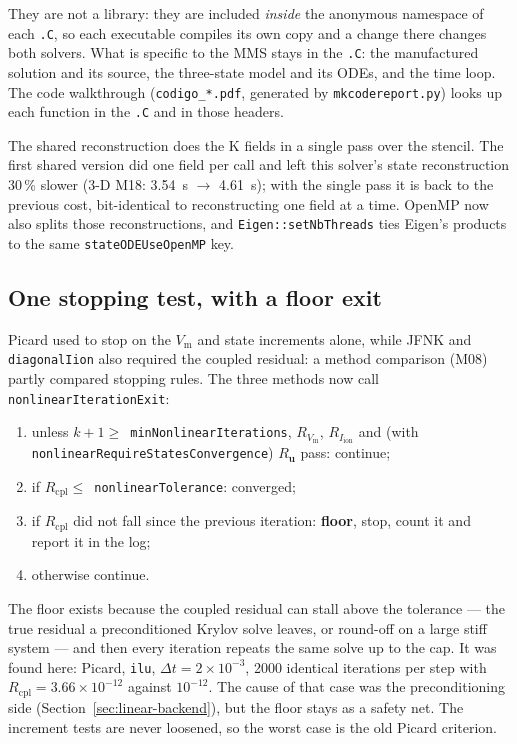 \documentclass[11pt,a4paper]{article}
\newcommand{\code}[1]{\texttt{\small #1}}
\newcommand{\Vm}{V_{\text{m}}}
\newcommand{\Iion}{I_{\mathrm{ion}}}
\begin{document}
They are not a library: they are included \emph{inside} the anonymous namespace of
each \code{.C}, so each executable compiles its own copy and a change there changes
both solvers. What is specific to the MMS stays in the \code{.C}: the manufactured
solution and its source, the three-state model and its ODEs, and the time loop.
The code walkthrough (\code{codigo\_*.pdf}, generated by \code{mkcodereport.py})
looks up each function in the \code{.C} and in those headers.

The shared reconstruction does the K fields in a single pass over the stencil. The
first shared version did one field per call and left this solver's state
reconstruction 30\,\% slower (3-D M18: 3.54~s $\to$ 4.61~s); with the single pass
it is back to the previous cost, bit-identical to reconstructing one field at a
time. OpenMP now also splits those reconstructions, and \code{Eigen::setNbThreads}
ties Eigen's products to the same \code{stateODEUseOpenMP} key.

\subsection{One stopping test, with a floor exit}
\label{sec:oct-stop}

Picard used to stop on the $\Vm$ and state increments alone, while JFNK and
\code{diagonalIion} also required the coupled residual: a method comparison (M08)
partly compared stopping rules. The three methods now call
\code{nonlinearIterationExit}:
\begin{enumerate}[nosep]
  \item unless $k+1\ge$~\code{minNonlinearIterations}, $R_{\Vm}$, $R_{\Iion}$ and
        (with \code{nonlinearRequireStatesConvergence}) $R_{\mathbf{u}}$ pass:
        continue;
  \item if $R_{\mathrm{cpl}}\le$~\code{nonlinearTolerance}: converged;
  \item if $R_{\mathrm{cpl}}$ did not fall since the previous iteration:
        \textbf{floor}, stop, count it and report it in the log;
  \item otherwise continue.
\end{enumerate}
The floor exists because the coupled residual can stall above the tolerance ---
the true residual a preconditioned Krylov solve leaves, or round-off on a large
stiff system --- and then every iteration repeats the same solve up to the cap. It
was found here: Picard, \code{ilu}, $\Delta t=2\times10^{-3}$, 2000 identical
iterations per step with $R_{\mathrm{cpl}}=3.66\times10^{-12}$ against $10^{-12}$.
The cause of that case was the preconditioning side
(Section~\ref{sec:linear-backend}), but the floor stays as a safety net. The
increment tests are never loosened, so the worst case is the old Picard criterion.
\end{document}
